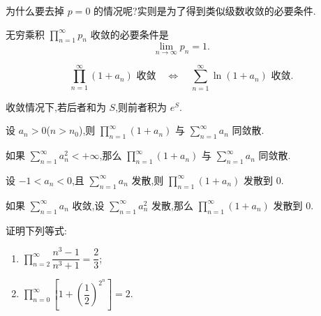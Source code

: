 为什么要去掉 $p=0$ 的情况呢?实则是为了得到类似级数收敛的必要条件.

\begin{theorem}[\markstar]
    无穷乘积 $\displaystyle\prod\limits_{n=1}^{\infty}p_n$ 收敛的必要条件是
    \[
        \displaystyle\lim\limits_{n\to\infty}p_n=1.
    \]
\end{theorem}

\begin{theorem}[\markstar]
    \[
        \displaystyle\prod\limits_{n=1}^{\infty}(1+a_n)\text{ 收敛}
        \quad\Longleftrightarrow\quad
        \sum\limits_{n=1}^{\infty}\ln(1+a_n)\text{ 收敛}.
    \]
\end{theorem}

\begin{remark}
    收敛情况下,若后者和为 $S$,则前者积为 $e^S$.
\end{remark}

\begin{theorem}[\markstar]
    设 $a_n>0$($n>n_0$),则 $\displaystyle\prod\limits_{n=1}^{\infty}(1+a_n)$ 与 $\displaystyle\sum\limits_{n=1}^{\infty}a_n$ 同敛散.
\end{theorem}

\begin{theorem}[\markstar]
    如果 $\displaystyle\sum\limits_{n=1}^{\infty}a_n^2<+\infty$,那么 $\displaystyle\prod\limits_{n=1}^{\infty}(1+a_n)$ 与 $\displaystyle\sum\limits_{n=1}^{\infty}a_n$ 同敛散.
\end{theorem}

\begin{theorem}
    设 $-1<a_n<0$,且 $\displaystyle\sum\limits_{n=1}^{\infty}a_n$ 发散,则 $\displaystyle\prod\limits_{n=1}^{\infty}(1+a_n)$ 发散到 $0$.
\end{theorem}

\begin{theorem}
    如果 $\displaystyle\sum\limits_{n=1}^{\infty}a_n$ 收敛,设 $\displaystyle\sum\limits_{n=1}^{\infty}a_n^2$ 发散,那么 $\displaystyle\prod\limits_{n=1}^{\infty}(1+a_n)$ 发散到 $0$.
\end{theorem}

\begin{example}
    证明下列等式:
    \begin{enumerate}
        \item $\displaystyle\prod\limits_{n=2}^{\infty}\dfrac{n^3-1}{n^3+1}=\dfrac{2}{3}$;
        \item $\displaystyle\prod\limits_{n=0}^{\infty}\left[1+\left(\dfrac{1}{2}\right)^{2^n}\right]=2$.
    \end{enumerate}
\end{example}
\exampleblank

